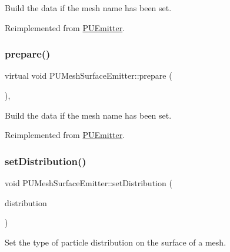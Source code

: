 Build the data if the mesh name has been set. 

Reimplemented from \hyperlink{classPUEmitter}{P\+U\+Emitter}.

\mbox{\label{classPUMeshSurfaceEmitter_aefa9d3f5f053d6d3ec5c79e5602c0db3}} 
\subsubsection{\texorpdfstring{prepare()}{prepare()}\hspace{0.1cm}{\footnotesize\ttfamily [2/2]}}
{\footnotesize\ttfamily virtual void P\+U\+Mesh\+Surface\+Emitter\+::prepare (\begin{DoxyParamCaption}{ }\end{DoxyParamCaption})\hspace{0.3cm}{\ttfamily [override]}, {\ttfamily [virtual]}}

Build the data if the mesh name has been set. 

Reimplemented from \hyperlink{classPUEmitter}{P\+U\+Emitter}.

\mbox{\label{classPUMeshSurfaceEmitter_ae5908bb7c27ec91f47b4123a78edda7c}} 
\subsubsection{\texorpdfstring{set\+Distribution()}{setDistribution()}\hspace{0.1cm}{\footnotesize\ttfamily [1/2]}}
{\footnotesize\ttfamily void P\+U\+Mesh\+Surface\+Emitter\+::set\+Distribution (\begin{DoxyParamCaption}\item[{\hyperlink{classMeshInfo_aadc99105abbc3bd033e33c6ba512a13b}{Mesh\+Info\+::\+Mesh\+Surface\+Distribution}}]{distribution }\end{DoxyParamCaption})}

Set the type of particle distribution on the surface of a mesh. \mbox{\label{classPUMeshSurfaceEmitter_ae5908bb7c27ec91f47b4123a78edda7c}} 
